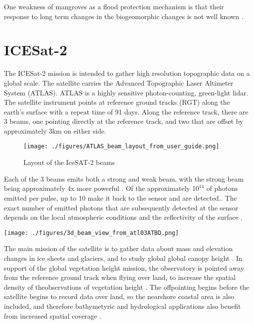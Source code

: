 One weakness of mangroves as a flood protection mechanism is that their response to long term changes in the biogeomorphic changes is not well known \parencite{Gijsman2021}.

\section{ICESat-2}

The ICESat-2 mission is intended to gather high resolution topographic data on a global scale. The satellite carries the Advanced Topographic Laser Altimeter System (ATLAS). ATLAS is a highly sensitive photon-counting, green-light lidar. The satellite instrument points at reference ground tracks (RGT) along the earth's surface with a repeat time of 91 days. Along the reference track, there are 3 beams, one pointing directly at the reference track, and two that are offset by approximately 3km on either side.

\begin{figure}
      \centering
      \texttt{[image: ./figures/ATLAS\_beam\_layout\_from\_user\_guide.png]}
      \caption{Layout of the IceSAT-2 beams}
\end{figure}

Each of the 3 beams emits both a strong and weak beam, with the strong beam being approximately 4x more powerful \parencite{Neumann2019d}. Of the approximately \(10^{14}\) of photons emitted per pulse, up to  10 make it back to the sensor and are detected.\parencite{Neumann2019d}. The exact number of emitted photons that are subsequently detected at the sensor depends on the local atmospheric conditions and the reflectivity of the surface \parencite{Neumann2019e}.

\texttt{[image: ./figures/3d\_beam\_view\_from\_atl03ATBD.png]}\parencite{Neumann2019d}

The main mission of the satellite is to gather data about mass and elevation changes in ice sheets and glaciers, and to study global global canopy height \parencite{Markus2017}. In support of the global vegetation height mission, the observatory is pointed away from the reference ground track when flying over land, to increase the spatial density of theobservations of vegetation height \parencite{Markus2017}. The offpointing begins before the satellite begins to record data over land, so the nearshore coastal area is also included, and therefore bathymetyric and hydrological applications also benefit from increased spatial coverage \parencite{Magruder2021}.

